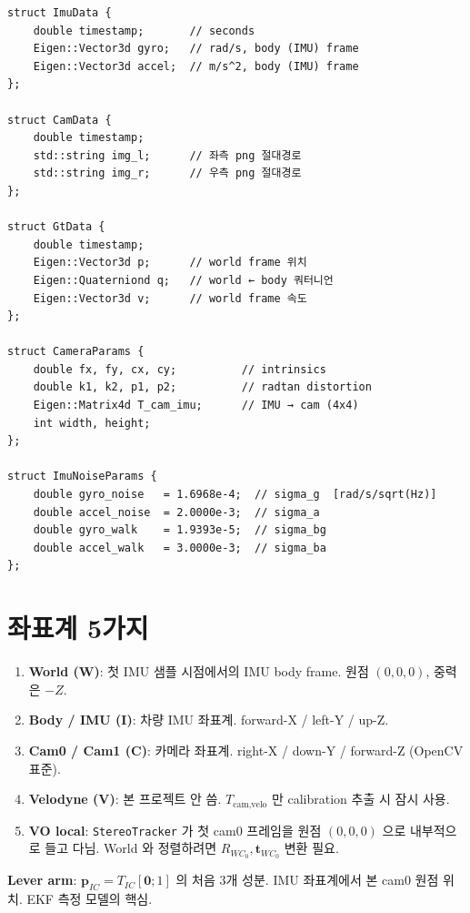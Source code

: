 \documentclass[11pt,a4paper,oneside]{report}
\begin{document}
\begin{lstlisting}[style=cpp,caption={핵심 struct}]
struct ImuData {
    double timestamp;       // seconds
    Eigen::Vector3d gyro;   // rad/s, body (IMU) frame
    Eigen::Vector3d accel;  // m/s^2, body (IMU) frame
};

struct CamData {
    double timestamp;
    std::string img_l;      // 좌측 png 절대경로
    std::string img_r;      // 우측 png 절대경로
};

struct GtData {
    double timestamp;
    Eigen::Vector3d p;      // world frame 위치
    Eigen::Quaterniond q;   // world ← body 쿼터니언
    Eigen::Vector3d v;      // world frame 속도
};

struct CameraParams {
    double fx, fy, cx, cy;          // intrinsics
    double k1, k2, p1, p2;          // radtan distortion
    Eigen::Matrix4d T_cam_imu;      // IMU → cam (4x4)
    int width, height;
};

struct ImuNoiseParams {
    double gyro_noise   = 1.6968e-4;  // sigma_g  [rad/s/sqrt(Hz)]
    double accel_noise  = 2.0000e-3;  // sigma_a
    double gyro_walk    = 1.9393e-5;  // sigma_bg
    double accel_walk   = 3.0000e-3;  // sigma_ba
};
\end{lstlisting}

\section{좌표계 5가지}

\begin{enumerate}
\item \textbf{World (W)}: 첫 IMU 샘플 시점에서의 IMU body frame. 원점 \((0,0,0)\), 중력은 \(-Z\).
\item \textbf{Body / IMU (I)}: 차량 IMU 좌표계. forward-X / left-Y / up-Z.
\item \textbf{Cam0 / Cam1 (C)}: 카메라 좌표계. right-X / down-Y / forward-Z (OpenCV 표준).
\item \textbf{Velodyne (V)}: 본 프로젝트 안 씀. \(T_{\text{cam,velo}}\) 만 calibration 추출 시 잠시 사용.
\item \textbf{VO local}: \texttt{StereoTracker} 가 첫 cam0 프레임을 원점 \((0,0,0)\) 으로 내부적으로 들고 다님. World 와 정렬하려면 \(R_{WC_0}, \bm{t}_{WC_0}\) 변환 필요.
\end{enumerate}

\textbf{Lever arm}: \(\bm{p}_{IC} = T_{IC} [\bm{0}; 1]\) 의 처음 3개 성분. IMU 좌표계에서 본 cam0 원점 위치. EKF 측정 모델의 핵심.


\end{document}
